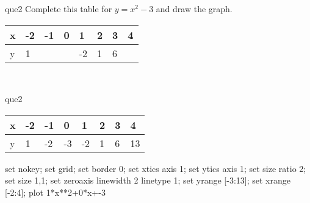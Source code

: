 \documentclass[13.5pt, varwidth=true]{beamer}
\begin{document}
\begin{frame}[shrink=19,fragile]
	\begin{beamercolorbox}[rounded=true, left, shadow=true,wd=14.8cm]{que2}
		 Complete this table for $y = x^{2} - 3$ and draw the graph. \\[0.3cm] \renewcommand{\arraystretch}{1.2}\begin{tabular}{|C|C|C|C|C|C|C|C|} \hline x & -2 & -1 & 0 & 1 & 2 & 3 & 4 \\ \hline y & 1 &  &  & -2 & 1 & 6 & \\ \hline \end{tabular}\\[0.3cm]
	\end{beamercolorbox}
\end{frame}
\begin{frame}[shrink=19,fragile]
	\begin{beamercolorbox}[rounded=true, left, shadow=true,wd=14.8cm]{que2}
		\renewcommand{\arraystretch}{1.2}\begin{tabular}{|C|C|C|C|C|C|C|C|} \hline x & -2 & -1 & 0 & 1 & 2 & 3 & 4 \\ \hline y & 1 & -2 & -3 & -2 & 1 & 6 & 13\\ \hline \end{tabular}\begin{gnuplot}[terminal=pdf] set nokey; set grid; set border 0; set xtics axis 1; set ytics axis 1; set size ratio 2; set size 1,1; set zeroaxis linewidth 2 linetype 1; set yrange [-3:13]; set xrange [-2:4]; plot 1*x**2+0*x+-3 \end{gnuplot}
	\end{beamercolorbox}
\end{frame}
\end{document}
